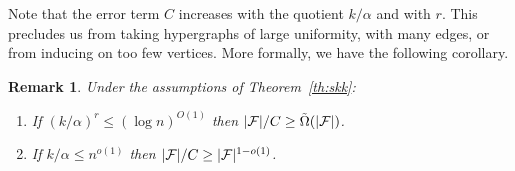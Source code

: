 \documentclass[11pt]{article}
\newtheorem{theo}{Theorem}[section]
\newtheorem{theo}{Theorem}[section]
\newtheorem{coro}[theo]{Corollary}
\newtheorem{remark}[theo]{Remark}
\newcommand{\FF}{{\cal F}}
\renewcommand{\wp}{\mathrm{span}}
\renewcommand{\a}{\alpha}
\begin{document}

Note that the error term $C$ increases with the quotient $k/\a$ and with $r$.
This precludes us from taking hypergraphs of large uniformity, with many edges, or from inducing on too few vertices.
More formally, we have the following corollary.

\begin{remark}
	Under the assumptions of Theorem~\ref{th:skk}: %
	\begin{enumerate}
		\item If $(k/\a)^r \le (\log n)^{O(1)}$ then $|\FF|/C \ge \tilde{\Omega}(|\FF|)$.
		\item If $k/\a \le n^{o(1)}$ then $|\FF|/C \ge |\FF|^{1-o(1)}$.
	\end{enumerate}
\end{remark}


\end{document}

